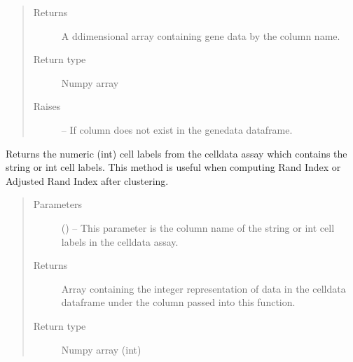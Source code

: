 \documentclass[letterpaper,10pt,english]{sphinxmanual}
\begin{document}
\begin{fulllineitems}
\begin{fulllineitems}
\begin{quote}
\begin{description}
\item[{Returns}] \leavevmode
A d\sphinxhyphen{}dimensional array containing gene data by the column name.

\item[{Return type}] \leavevmode
Numpy array

\item[{Raises}] \leavevmode
{} – If column does not exist in the genedata dataframe.

\end{description}\end{quote}

\end{fulllineitems}


\begin{fulllineitems}
\label{\detokenize{index:singlecelldata.SingleCell.getNumericCellLabels}}
Returns the numeric (int) cell labels from the celldata assay which contains the string or int cell labels.
This method is useful when computing Rand Index or Adjusted Rand Index after clustering.
\begin{quote}\begin{description}
\item[{Parameters}] \leavevmode
{} () – This parameter is the column name of the string or int cell labels in the celldata assay.

\item[{Returns}] \leavevmode
Array containing the integer representation of data in the celldata dataframe under the
column passed into this function.

\item[{Return type}] \leavevmode
Numpy array (int)

\end{description}\end{quote}

\end{fulllineitems}



\end{fulllineitems}
\end{document}
